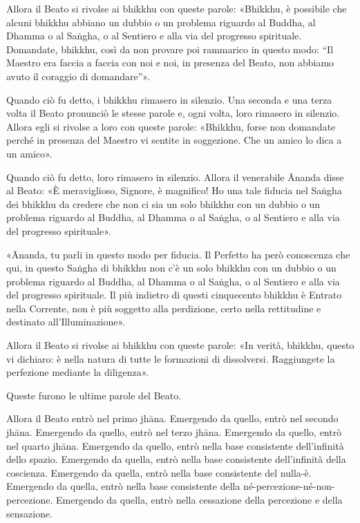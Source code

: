 
Allora il Beato si rivolse ai bhikkhu con queste parole: «Bhikkhu, è possibile
che alcuni bhikkhu abbiano un dubbio o un problema riguardo al Buddha, al Dhamma
o al Saṅgha, o al Sentiero e alla via del progresso spirituale. Domandate,
bhikkhu, così da non provare poi rammarico in questo modo: “Il Maestro era
faccia a faccia con noi e noi, in presenza del Beato, non abbiamo avuto il
coraggio di domandare”».

Quando ciò fu detto, i bhikkhu rimasero in silenzio. Una seconda e una terza
volta il Beato pronunciò le stesse parole e, ogni volta, loro rimasero in
silenzio. Allora egli si rivolse a loro con queste parole: «Bhikkhu, forse non
domandate perché in presenza del Maestro vi sentite in soggezione. Che un amico
lo dica a un amico».

Quando ciò fu detto, loro rimasero in silenzio. Allora il venerabile Ānanda
disse al Beato: «È meraviglioso, Signore, è magnifico! Ho una tale fiducia nel
Saṅgha dei bhikkhu da credere che non ci sia un solo bhikkhu con un dubbio o un
problema riguardo al Buddha, al Dhamma o al Saṅgha, o al Sentiero e alla via del
progresso spirituale».

«Ānanda, tu parli in questo modo per fiducia. Il Perfetto ha però conoscenza che
qui, in questo Saṅgha di bhikkhu non c’è un solo bhikkhu con un dubbio o un
problema riguardo al Buddha, al Dhamma o al Saṅgha, o al Sentiero e alla via del
progresso spirituale. Il più indietro di questi cinquecento bhikkhu è Entrato
nella Corrente, non è più soggetto alla perdizione, certo nella rettitudine e
destinato all’Illuminazione».

Allora il Beato si rivolse ai bhikkhu con queste parole: «In verità, bhikkhu,
questo vi dichiaro: è nella natura di tutte le formazioni di dissolversi.
Raggiungete la perfezione mediante la diligenza».


\label{pag364}%
Queste furono le ultime parole del Beato.

Allora il Beato entrò nel primo jhāna. Emergendo da quello, entrò nel secondo
jhāna. Emergendo da quello, entrò nel terzo jhāna. Emergendo da quello, entrò
nel quarto jhāna. Emergendo da quello, entrò nella base consistente
dell’infinità dello spazio. Emergendo da quella, entrò nella base consistente
dell’infinità della coscienza. Emergendo da quella, entrò nella base consistente
del nulla-è. Emergendo da quella, entrò nella base consistente della
né-percezione-né-non-percezione. Emergendo da quella, entrò nella cessazione
della percezione e della sensazione.

